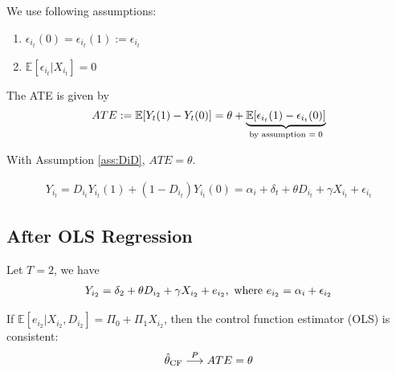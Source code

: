 \documentclass[11pt]{elegantbook}
\begin{document}
\begin{assumption}\label{ass:DiD}
    We use following assumptions:
    \begin{enumerate}
        \item $\epsilon_{i_t}(0)=\epsilon_{i_t}(1):=\epsilon_{i_t}$
        \item $\mathbb{E}[\epsilon_{i_t}|X_{i_t}]=0$
    \end{enumerate}
\end{assumption}

The ATE is given by
\begin{equation}
    \begin{aligned}
        ATE:=\mathbb{E}[Y_{t}(1)-Y_{t}(0)]=\theta+\underbrace{\mathbb{E}[\epsilon_{i_t}(1)-\epsilon_{i_t}(0)]}_\textnormal{by assumption $=0$}
    \end{aligned}
    \nonumber
\end{equation}
\begin{lemma}
    With Assumption \ref{ass:DiD}, $ATE=\theta$.
\end{lemma}

\begin{equation}
    \begin{aligned}
        Y_{i_t}=D_{i_t}Y_{i_t}(1)+(1-D_{i_t})Y_{i_t}(0)=\alpha_i+\delta_t+\theta D_{i_t}+\gamma X_{i_t}+\epsilon_{i_t}
    \end{aligned}
    \nonumber
\end{equation}

\subsection{After OLS Regression}
Let $T=2$, we have
\begin{equation}
    \begin{aligned}
        Y_{i_2}=\delta_2+\theta D_{i_2}+\gamma X_{i_2}+e_{i_2}, \textnormal{ where }e_{i_2}=\alpha_i+\epsilon_{i_2}
    \end{aligned}
    \nonumber
\end{equation}
\begin{theorem}
    If $\mathbb{E}[e_{i_2}|X_{i_2},D_{i_2}]=\Pi_0+\Pi_1 X_{i_2}$, then the control function estimator (OLS) is consistent:
    \begin{equation}
        \begin{aligned}
            \hat{\theta}_\textnormal{CF} \stackrel{P}{\longrightarrow} ATE=\theta
        \end{aligned}
        \nonumber
    \end{equation}
\end{theorem}
\end{document}
